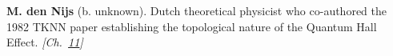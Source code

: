 \textbf{M. den Nijs} (b. unknown). Dutch theoretical physicist who co-authored the 1982 TKNN paper establishing the topological nature of the Quantum Hall Effect. \emph{[Ch.~\hyperref[ch:topologicalinsulators]{11}]}

